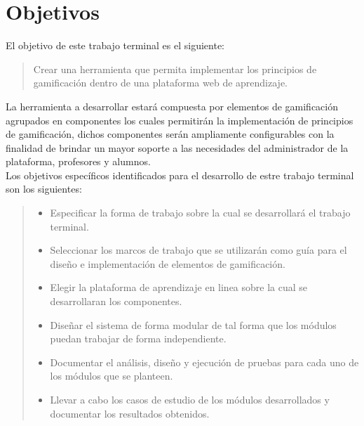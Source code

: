 \section{Objetivos} \label{sec:objetivos}

 \noindent El objetivo de este trabajo terminal es el siguiente:

    \begin{quote}
    \colorbox{blue!05}{\parbox{\dimexpr\linewidth-2\fboxsep}{\strut
        Crear una herramienta que permita implementar los principios
        de gamificación dentro de una plataforma web de aprendizaje.
    \strut}}
    \end{quote}

 \noindent La herramienta a desarrollar estará compuesta por elementos de gamificación agrupados en
 componentes los cuales permitirán la implementación de principios de gamificación, dichos
 componentes serán ampliamente configurables con la finalidad de brindar un mayor soporte a las
 necesidades del administrador de la plataforma, profesores y alumnos.\\

 Los objetivos específicos identificados para el desarrollo de estre trabajo terminal son los siguientes:

    \begin{quote}
    \begin{itemize}%
        \item Especificar la forma de trabajo sobre la cual se
              desarrollará el trabajo terminal.
              
        \item Seleccionar los marcos de trabajo que se utilizarán como
              guía para el diseño e implementación de elementos de gamificación.
        
        \item Elegir la plataforma de aprendizaje en linea sobre
              la cual se desarrollaran los componentes.
              
        \item Diseñar el sistema de forma modular de tal forma que los módulos
              puedan trabajar de forma independiente.
        
        \item Documentar el análisis, diseño y ejecución de pruebas para cada
              uno de los módulos que se planteen.

        \item Llevar a cabo los casos de estudio de los módulos desarrollados y
              documentar los resultados obtenidos. 
    \end{itemize}
    \end{quote}

